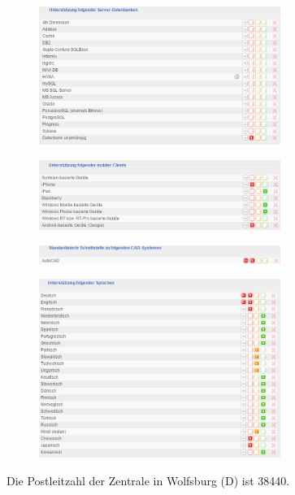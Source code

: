 \documentclass[12pt]{article}
\begin{document}
\noindent
\begin{figure}[!h]
\centering
\includegraphics[width=0.7\textwidth]{images/tr49}
\end{figure}\FloatBarrier
\noindent
\begin{figure}[!h]
\centering
\includegraphics[width=0.7\textwidth]{images/tr50}
\end{figure}\FloatBarrier
\noindent
\begin{figure}[!h]
\centering
\includegraphics[width=0.7\textwidth]{images/tr51}
\end{figure}\FloatBarrier
\noindent
\begin{figure}[!h]
\centering
\includegraphics[width=0.7\textwidth]{images/tr52}
\end{figure}\FloatBarrier
\noindent
Die Postleitzahl der Zentrale in Wolfsburg (D) ist 38440.
\end{document}
